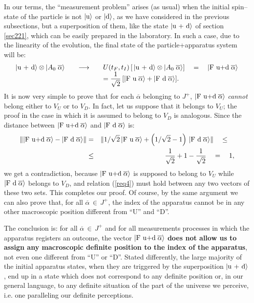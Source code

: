 \documentclass[10pt,a4paper]{article}
\begin{document}
In our terms, the ``measurement problem'' arises (as usual) when
the initial spin--state of the particle is not
$|\makebox{u}\rangle$ or $|\makebox{d}\rangle$, as we have
considered in the previous subsections, but a superposition of
them, like the state $|\makebox{u + d}\rangle$ of section
\ref{sec221}, which can be easily prepared in the laboratory. In
such a case, due to the linearity of the evolution, the final
state of the particle+apparatus system will be:
\[
\begin{array}{lcl}
|\makebox{u +
d}\rangle\otimes|\makebox{$A_{0}$}\;\overline{\alpha} \rangle
\quad & \longrightarrow & \quad U(t_{F}, t_{I})\left[\,
|\makebox{u + d}\rangle\otimes|
\makebox{$A_{0}$}\;\overline{\alpha} \rangle \right]\quad = \quad
|\makebox{F u+d}\;\overline{\alpha}
\rangle\\
& & \quad= {\displaystyle \frac{1}{\sqrt{2}}\left[ |\makebox{F
u}\;\overline{\alpha}\rangle + |\makebox{F
d}\;\overline{\alpha}\rangle \right]}.
\end{array}
\]
It is now very simple to prove that for each $\overline{\alpha}$
belonging to $J^{+}$, $|\makebox{F u+d}\;\overline{\alpha}\rangle$
{\it cannot} belong either to $V_{U}$ or to $V_{D}$. In fact, let
us suppose that it belongs to $V_{U}$; the proof in the case in
which it is assumed to belong to $V_{D}$ is analogous. Since the
distance between $|\makebox{F u+d}\;\overline{\alpha}\rangle$  and
$|\makebox{F d}\;\overline{\alpha}\rangle$ is:
\begin{eqnarray*}
\| |\makebox{F u+d}\;\overline{\alpha}\rangle - |\makebox{F
d}\;\overline{\alpha}\rangle \| & = & \| 1/\sqrt{2}\, |\makebox{F
u}\;\overline{\alpha}\rangle + \left( 1/\sqrt{2} - 1\right) \,
|\makebox{F d}\;\overline{\alpha}\rangle \| \quad \leq \quad \\
& \leq & \frac{1}{\sqrt{2}} + 1 - \frac{1}{\sqrt{2}} \quad = \quad
1,
\end{eqnarray*}
we get a contradiction, because $|\makebox{F u+d}\;
\overline{\alpha}\rangle$ is supposed to belong to $V_{U}$ while
$|\makebox{F d}\;\overline{\alpha}\rangle$ belongs to $V_{D}$, and
relation (\ref{req4}) must hold between any two vectors of these
two sets. This completes our proof. Of course, by the same
argument we can also prove that, for all
$\overline{\alpha}\,\in\,J^{+}$, the index of the apparatus cannot
be in any other macroscopic position different from ``U'' and
``D''.

The conclusion is: for all $\overline{\alpha}\,\in\,J^{+}$ and for
all measurements processes in which the apparatus registers an
outcome, the vector $|\makebox{F u+d}\;\overline{\alpha}\rangle$
{\bf does not allow us to assign  any macroscopic definite
position to the index  of the apparatus}, not even  one different
from ``U'' or ``D''. Stated differently, the large majority of the
initial apparatus states, when they are triggered by the
superposition $|\makebox{u + d}\rangle$, end up in a state which
does not correspond to any definite position or, in our general
language, to any definite situation of the part of the universe we
perceive, i.e. one paralleling our definite perceptions.
\end{document}
